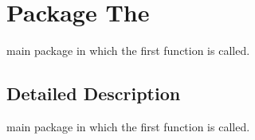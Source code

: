 \hypertarget{namespace_the}{\section{Package The}
\label{namespace_the}
}


main package in which the first function is called.  




\subsection{Detailed Description}
main package in which the first function is called. 
